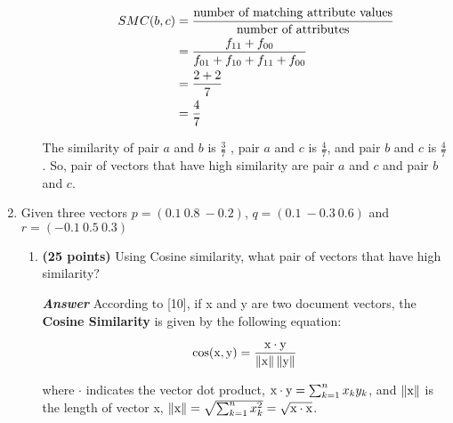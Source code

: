 \documentclass[12pt]{article}%
\begin{document}
\begin{enumerate}
\begin{enumerate}
\begin{enumerate}
			\begin{align*}
				SMC(b,c) & = \frac{\textup{number of matching attribute values}}{\textup{number of attributes}} \\ 
				& = \frac{f_{11}+f_{00}}{f_{01}+f_{10}+f_{11}+f_{00}} \\
				& = \frac{2 + 2}{7} \\
				& = \frac{4}{7}
			\end{align*}

		\end{enumerate}
		\par The similarity of pair $a$ and $b$ is $\frac{3}{7}$ , pair $a$ and $c$ is $\frac{4}{7}$, and pair $b$ and $c$ is $\frac{4}{7}$. So, pair of vectors that have high similarity are pair $a$ and $c$ and pair $b$ and $c$.
	\end{enumerate}

	\item Given three vectors $p = (0.1 \ 0.8 \ -0.2)$, $ q = (0.1 \ -0.3 \ 0.6)$ and $r = (-0.1 \ 0.5 \ 0.3)$
	\begin{enumerate}
		\item \textbf{(25 points)} Using Cosine similarity, what pair of vectors that have high similarity?
		\par \textbf{\textit{Answer}} According to [10], if x and y are two document vectors, the \textbf{Cosine Similarity} is given by the following equation:

		\begin{equation}
			\cos (\textup{x},\textup{y}) = \frac{\textup{x}\cdot  \textup{y}}{\left \| \textup{x} \right \| \left \| \textup{y} \right \|}
		\end{equation}

		\par where $\cdot$ indicates the vector dot product, $\textup{x} \cdot \textup{y} = \sum_{k=1}^{n} x_k y_k$, and $\left \| \textup{x} \right \|$ is the length of vector x, $\left \| \textup{x} \right \| = \sqrt{\sum_{k=1}^{n}x_{k}^{2}} = \sqrt{\textup{x}\cdot \textup{x}}$.


\end{enumerate}
\end{enumerate}
\end{document}
